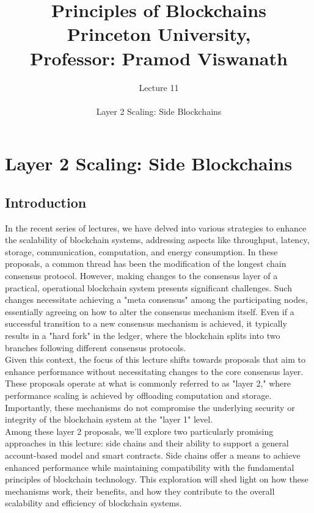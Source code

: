 \documentclass{report}
\title{\Huge{Principles of Blockchains \\ Princeton University,\\
		Professor: Pramod Viswanath}}
\author{\huge{Lecture 11} \\\\ Layer 2 Scaling: Side Blockchains}
\begin{document}
\maketitle
\newpage%
\tableofcontents
\pagebreak

\chapter{Layer 2 Scaling: Side Blockchains}
\section{Introduction}

In the recent series of lectures, we have delved into various strategies to enhance the scalability of blockchain systems, addressing aspects like throughput, latency, storage, communication, computation, and energy consumption. In these proposals, a common thread has been the modification of the longest chain consensus protocol. However, making changes to the consensus layer of a practical, operational blockchain system presents significant challenges. Such changes necessitate achieving a "meta consensus" among the participating nodes, essentially agreeing on how to alter the consensus mechanism itself. Even if a successful transition to a new consensus mechanism is achieved, it typically results in a "hard fork" in the ledger, where the blockchain splits into two branches following different consensus protocols.\\
Given this context, the focus of this lecture shifts towards proposals that aim to enhance performance without necessitating changes to the core consensus layer. These proposals operate at what is commonly referred to as "layer 2," where performance scaling is achieved by offloading computation and storage. Importantly, these mechanisms do not compromise the underlying security or integrity of the blockchain system at the "layer 1" level.\\
Among these layer 2 proposals, we'll explore two particularly promising approaches in this lecture: side chains and their ability to support a general account-based model and smart contracts. Side chains offer a means to achieve enhanced performance while maintaining compatibility with the fundamental principles of blockchain technology. This exploration will shed light on how these mechanisms work, their benefits, and how they contribute to the overall scalability and efficiency of blockchain systems.
\end{document}
